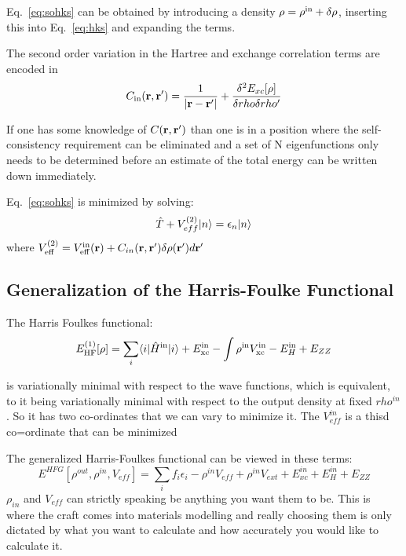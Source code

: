 Eq.~\ref{eq:sohks} can be obtained by introducing a density $\rho = \rho^{\rm in} + \delta\rho$, inserting this into
Eq.~\ref{eq:hks} and expanding the terms. 

The second order variation in the Hartree and exchange correlation terms are encoded in
%
\begin{equation}
C_{\rm in}({\bf r},{\bf r}') = \frac{1}{|{\bf r}-{\bf r}'|} + \frac{\delta^{2}E_{xc}[\rho]}{\delta rho \delta rho'}
\end{equation}

If one has some knowledge of $C({\bf r},{\bf r}')$ than one is in a position where the self-consistency 
requirement can be eliminated and a set of N eigenfunctions only needs to be determined 
before an estimate of the total energy can be written down immediately.

Eq.~\ref{eq:sohks} is minimized by solving:
%
\begin{equation}
\hat{T} + V_{eff}^{(2)}|n\rangle= \epsilon_{n}|n\rangle
\end{equation}
%
where $V_{\rm eff}^{(2)}=V^{\rm in}_{\rm eff}({\bf r}) + C_{in}({\bf r},{\bf r}')\delta \rho({\bf r}')d{\bf r}'$

%

\subsection{Generalization of the Harris-Foulke Functional}

The Harris Foulkes functional:
%
\begin{equation}
E^{(1)}_{\rm HF}[\rho] = \sum_{i} \langle i |\hat{H}^{\rm in}|i\rangle + E_{\rm xc}^{\rm in} - \int \rho^{\rm in}V^{\rm in}_{\rm xc} - E^{\rm in}_{H} + E_{ZZ}
\end{equation}

is variationally minimal with respect to the wave functions, which is equivalent, to it being variationally minimal
with respect to the output density at fixed $rho^{in}$. So it has two co-ordinates that
we can vary to minimize it. The $V^{in}_{eff}$ is a thisd co=ordinate that can be minimized

The generalized Harris-Foulkes functional can be viewed in these terms:
%
\begin{equation}
E^{HFG}[\rho^{out}, \rho^{in}, V_{eff}] = \sum_{i}f_{i}\epsilon_{i}-\rho^{in}V_{eff}+\rho^{in}V_{ext}+E_{xc}^{in}+E_{H}^{in}+E_{ZZ}
\end{equation}
%
$\rho_{in}$ and $V_{eff}$ can strictly speaking be anything you want them to be. This is where the 
craft comes into materials modelling and really choosing them is only dictated by what you
want to calculate and how accurately you would like to calculate it. 

